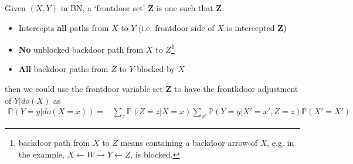 \begin{itemize}[topsep=2pt,itemsep=0pt]
        Given $ (X,Y) $ in BN, a `frontdoor set' $ \bm{Z} $ is one such that $ \bm{Z} $:
        \begin{itemize}[topsep=2pt,itemsep=0pt]
            \item Intercepts \textbf{all} paths from $ X $ to $ Y $ (i.e. frontdoor side of $ X $ is intercepted $ \bm{Z} $)
            \item \textbf{No} unblocked backdoor path from $ X $ to $ Z $\footnote{backdoor path from $ X $ to $ Z $ means containing a backdoor arrow of $ X $, e.g. in the example, $ X\leftarrow W\to Y\leftarrow Z $, is blocked.}
            \item \textbf{All} backdoor paths from $ Z $ to $ Y $ blocked by $ X $
        \end{itemize}
        then we could use the frontdoor variable set $ \bm{Z} $ to have the frontkdoor adjustment of $Y |do(X)$ as
        \begin{align}
            \mathbb{P}\left( Y=y\big| do(X=x) \right) = & \sum_{z}\mathbb{P}\left( Z=z|X=x \right)\sum_{x'}\mathbb{P}\left( Y=y|X'=x',Z=z \right)\mathbb{P}\left( X'=X' \right)  
        \end{align}
        
\end{itemize}
